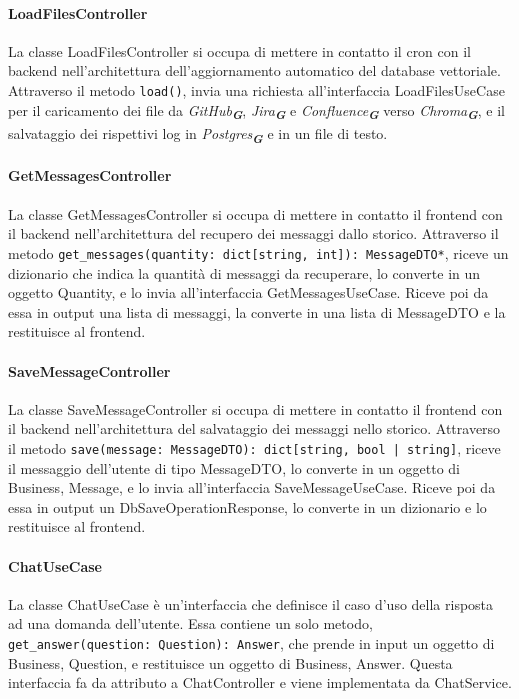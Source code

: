 \paragraph{LoadFilesController}
\label{sec:load_files_controller}
La classe LoadFilesController si occupa di mettere in contatto il cron con il backend nell'architettura dell'aggiornamento automatico del database vettoriale. Attraverso il metodo \texttt{load()}, invia una richiesta all'interfaccia LoadFilesUseCase per il caricamento dei file da \emph{GitHub}\textsubscript{\textbf{\textit{G}}}, \emph{Jira}\textsubscript{\textbf{\textit{G}}} e \emph{Confluence}\textsubscript{\textbf{\textit{G}}} verso \emph{Chroma}\textsubscript{\textbf{\textit{G}}}, e il salvataggio dei rispettivi log in \emph{Postgres}\textsubscript{\textbf{\textit{G}}} e in un file di testo.

\paragraph{GetMessagesController}
\label{sec:get_messages_controller}
La classe GetMessagesController si occupa di mettere in contatto il frontend con il backend nell'architettura del recupero dei messaggi dallo storico. Attraverso il metodo \texttt{get\_messages(quantity: dict[string, int]): MessageDTO*}, riceve un dizionario che indica la quantità di messaggi da recuperare, lo converte in un oggetto Quantity, e lo invia all'interfaccia GetMessagesUseCase. Riceve poi da essa in output una lista di messaggi, la converte in una lista di MessageDTO e la restituisce al frontend.

\paragraph{SaveMessageController}
\label{sec:save_message_controller}
La classe SaveMessageController si occupa di mettere in contatto il frontend con il backend nell'architettura del salvataggio dei messaggi nello storico. Attraverso il metodo \texttt{save(message: MessageDTO): dict[string, bool | string]}, riceve il messaggio dell'utente di tipo MessageDTO, lo converte in un oggetto di Business, Message, e lo invia all'interfaccia SaveMessageUseCase. Riceve poi da essa in output un DbSaveOperationResponse, lo converte in un dizionario e lo restituisce al frontend.

\newpage


\label{sec:use_case}

\paragraph{ChatUseCase}
\label{sec:chat_use_case}
La classe ChatUseCase è un'interfaccia che definisce il caso d'uso della risposta ad una domanda dell'utente. Essa contiene un solo metodo, \texttt{get\_answer(question: Question): Answer}, che prende in input un oggetto di Business, Question, e restituisce un oggetto di Business, Answer. Questa interfaccia fa da attributo a ChatController e viene implementata da ChatService.

